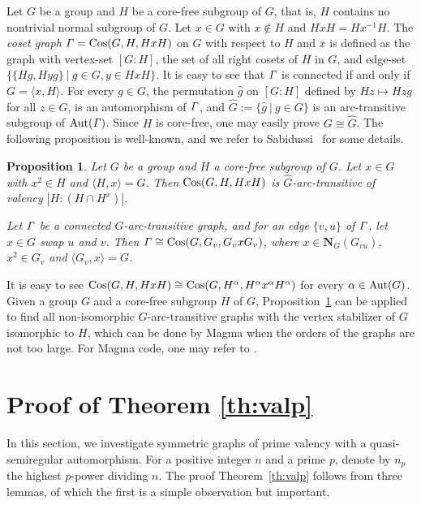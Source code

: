 \documentclass[12pt,reqno]{amsart}
\newcommand\N{\mathbf{N}}
\numberwithin {equation} {section}
\newtheorem{proposition}[theorem]{Proposition}
\begin{document}
Let $G$ be a group and $H$ be a core-free subgroup of $G$, that is, $H$ contains no nontrivial normal subgroup of $G$. Let $x \in G$ with $x \notin H$ and $HxH=Hx^{-1}H $. The \emph{coset graph} ${\it \Gamma}=\mathrm{Cos}(G,H,HxH)$ on $G$ with respect to $H$ and $x$ is defined as the graph with vertex-set $[G{:}H]$, the set of all right cosets of $H$ in $G$, and edge-set $\{\{Hg,Hyg\}\ |\ g\in G, y\in HxH\}$. It is easy to see that ${\it \Gamma}$ is connected if and only if $G=\langle x,H\rangle$. For every $g\in G$, the permutation $\hat{g}$ on $[G{:}H]$ defined by $Hz\mapsto Hzg$ for all $z\in G$,  is an automorphism of ${\it \Gamma}$, and $\hat{G}:=\{\hat{g}\ |\ g\in G\}$ is an arc-transitive subgroup of $\mathrm{Aut}({\it \Gamma})$. Since $H$ is core-free, one may easily prove $G\cong \hat{G}$. The following proposition is well-known, and we refer to Sabidussi~\cite{Sabi} for some details.

\begin{proposition}\label{pro:cosetcons}
Let $G$ be a group and $H$ a core-free subgroup of $G$. Let $x \in G$ with $x^2 \in H$ and $\langle H,x \rangle=G$. Then $\mathrm{Cos}(G,H,HxH)$ is $\hat{G}$-arc-transitive of valency $|H{:}(H \cap H^x)|$.

Let ${\it \Gamma}$ be a connected $G$-arc-transitive graph, and for an edge $\{ v,u \}$ of ${\it \Gamma}$, let $x \in G$ swap $u$ and $v$. Then ${\it \Gamma} \cong \mathrm{Cos}(G,G_v,G_v xG_v )$, where $x\in \N_G(G_{vu})$, $x^2 \in G_v$ and $\langle G_v ,x\rangle=G$.

\end{proposition}

It is easy to see $\mathrm{Cos}(G,H,HxH) \cong \mathrm{Cos}(G,H^\alpha,H^\alpha x^\alpha H^\alpha)$ for every $ \alpha \in \mathrm{Aut}(G)$. Given a group $G$ and a core-free subgroup $H$ of $G$, Proposition~\ref{pro:cosetcons} can be applied to find all non-isomorphic $G$-arc-transitive graphs with the vertex stabilizer of $G$ isomorphic to $H$, which can be done by {\sc Magma} when the orders of the graphs are not too large. For {\sc Magma} code, one may refer to \cite[Appendix]{DF19}.

\section{Proof of Theorem \ref{th:valp}}\label{sec:valp}

In this section, we investigate symmetric graphs of prime valency with a quasi-semiregular automorphism. For a positive integer $n$ and a prime $p$, denote by $n_p$ the highest $p$-power dividing $n$. The proof Theorem~\ref{th:valp} follows from three lemmas, of which the first is a simple observation but important.
\end{document}
